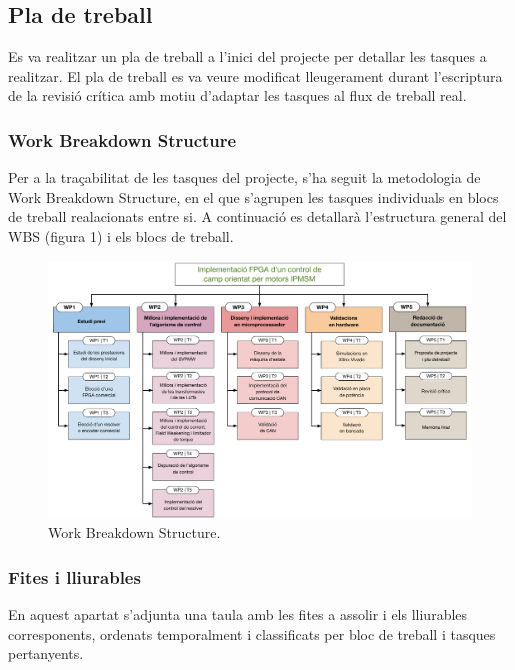 \subsection { Pla de treball }
{
    Es va realitzar un pla de treball a l'inici del projecte per detallar les
    tasques a realitzar. El pla de treball es va veure modificat lleugerament
    durant l'escriptura de la revisió crítica amb motiu d'adaptar les tasques
    al flux de treball real.

    \subsubsection { Work Breakdown Structure }
    {
        Per a la traçabilitat de les tasques del projecte, s'ha seguit la
        metodologia de Work Breakdown Structure, en el que s'agrupen les
        tasques individuals en blocs de treball realacionats entre si. A
        continuació es detallarà l'estructura general del \ac{WBS} (figura 1) i
        els blocs de treball.

        \begin{figure}[!htb]
            \centering
            \captionsetup{justification=centering, margin=1.5cm}
            \includegraphics[width=15cm]
                { img/introduccio/wbs.pdf }
            \caption{ Work Breakdown Structure. }
        \end{figure}

        

    }

    \subsubsection { Fites i lliurables }
    {
        En aquest apartat s'adjunta una taula amb les fites a assolir i els
        lliurables corresponents, ordenats temporalment i classificats per bloc
        de treball i tasques pertanyents.

}}
